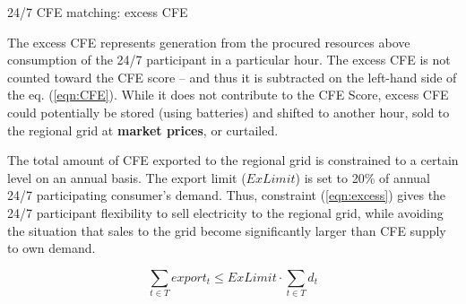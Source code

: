 \begin{frame}{24/7 CFE matching: excess CFE}

  {\footnotesize

  The \alert{excess CFE} represents generation from the procured resources above consumption of the 24/7 participant in a particular hour.  The excess CFE \alert{is not counted toward the CFE score} -- and thus it is subtracted on the left-hand side of the eq. (\ref{eqn:CFE}). While it does not contribute to the CFE Score, excess CFE could potentially be stored (using batteries) and shifted to another hour, sold to the regional grid at {\bf market prices}, or curtailed. 

  \vspace{0.2cm}

  The total amount of CFE exported to the regional grid is constrained to a certain level on an annual basis. The export limit ($ExLimit$) is set to 20\% of annual 24/7 participating consumer's demand. 
  Thus, constraint (\ref{eqn:excess}) gives the 24/7 participant flexibility to sell electricity to the regional grid, while avoiding the situation that sales to the grid become significantly larger than CFE supply to own demand.
  
  \begin{equation}
  \sum_{t\in T} export_t \leq ExLimit \cdot \sum_{t\in T} d_t
  \label{eqn:excess}
  \end{equation}

  \vspace{0.2cm}
  \noindent{}
  }

\end{frame}



